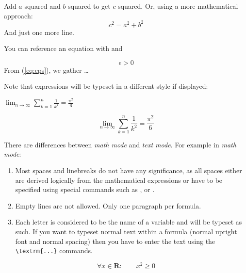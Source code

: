 \begin{example}
Add $a$ squared and $b$ squared 
to get $c$ squared. Or, using 
a more mathematical approach:
\begin{displaymath}
c^{2}=a^{2}+b^{2}
\end{displaymath}
And just one more line.
\end{example}

You can reference an equation with  and 

\begin{example}
\begin{equation} \label{eq:eps}
\epsilon > 0
\end{equation}
From (\ref{eq:eps}), we gather 
\ldots
\end{example}

Note that expressions will be typeset in a different style if displayed:
\begin{example}
$\lim_{n \to \infty} 
\sum_{k=1}^n \frac{1}{k^2} 
= \frac{\pi^2}{6}$
\end{example}
\begin{example}
\begin{displaymath}
\lim_{n \to \infty} 
\sum_{k=1}^n \frac{1}{k^2} 
= \frac{\pi^2}{6}
\end{displaymath}
\end{example}



There are differences between \emph{math mode} and \emph{text mode}. For
example in \emph{math mode}: 

\begin{enumerate}

\item Most spaces and linebreaks do not have any significance, as all spaces
either are derived logically from the mathematical expressions or
have to be specified using special commands such as \ci{,},  or
.
 
\item Empty lines are not allowed. Only one paragraph per formula.

\item Each letter is considered to be the name of a variable and will be
typeset as such. If you want to typeset normal text within a formula
(normal upright font and normal spacing) then you have to enter the
text using the \verb|\textrm{...}| commands.
\end{enumerate}


\begin{example}
\begin{equation}
\forall x \in \mathbf{R}:
\qquad x^{2} \geq 0
\end{equation}
\end{example}

